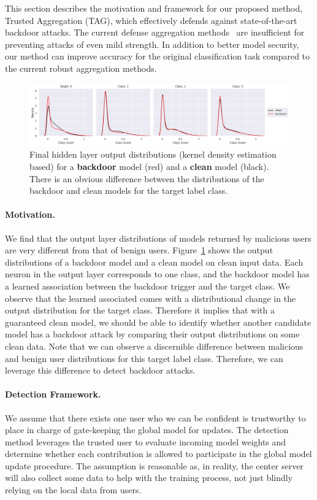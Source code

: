 \documentclass{article} %
\begin{document}
This section describes the motivation and framework for our proposed method, Trusted Aggregation (TAG), which effectively defends against state-of-the-art backdoor attacks. The current defense aggregation methods~\citep{fedavg,trim-mean} are insufficient for preventing attacks of even mild strength. In addition to better model security, our method can improve accuracy for the original classification task compared to the current robust aggregation methods.

\begin{figure}[htp]
    \centering
    \includegraphics[width=\textwidth]{pics/ext_motivation.png}
    \caption{\footnotesize Final hidden layer output distributions (kernel density estimation based) for a {\color{red}\bf backdoor} model (red) and a {\bf clean} model (black). There is an obvious difference between the distributions of the backdoor and clean models for the target label class.}
    \label{fig: motivation}
\end{figure}

\paragraph{Motivation.} We find that the output layer distributions of models returned by malicious users are very different from that of benign users. Figure~\ref{fig: motivation} shows the output distributions of a backdoor model and a clean model on clean input data.  Each neuron in the output layer corresponds to one class, and the backdoor model has a learned association between the backdoor trigger and the target class. We observe that the learned associated comes with a distributional change in the output distribution for the target class. Therefore it implies that with a guaranteed clean model, we should be able to identify whether another candidate model has a backdoor attack by comparing their output distributions on some clean data.
Note that we can observe a discernible difference between malicious and benign user distributions for this target label class. Therefore, we can leverage this difference to detect backdoor attacks.

\paragraph{Detection Framework.}
We assume that there exists one user who we can be confident is trustworthy to place in charge of gate-keeping the global model for updates. The detection method leverages the trusted user to evaluate incoming model weights and determine whether each contribution is allowed to participate in the global model update procedure. The assumption is reasonable as, in reality, the center server will also collect some data to help with the training process, not just blindly relying on the local data from users.
\end{document}
